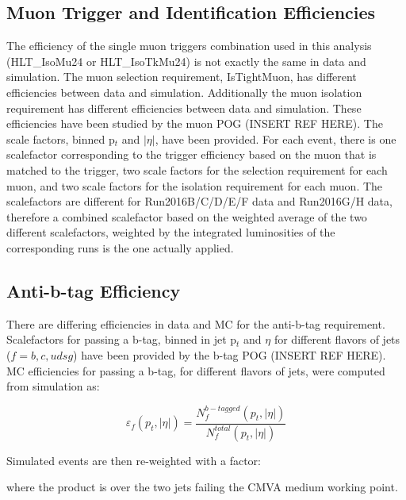\documentclass[
    10pt, %
    a4paper, %
    oneside, %
    headinclude,footinclude, %
    BCOR5mm, %
]{scrartcl}
\begin{document}
    \subsection{Muon Trigger and Identification Efficiencies}
    The efficiency of the single muon triggers combination used in this analysis (HLT\_IsoMu24 or HLT\_IsoTkMu24) is not exactly the same in data and simulation. 
    The muon selection requirement, IsTightMuon, has different efficiencies between data and simulation.
    Additionally the muon isolation requirement has different efficiencies between data and simulation.
    These efficiencies have been studied by the muon POG (INSERT REF HERE).
    The scale factors, binned p$_t$ and $|\eta|$, have been provided.
    For each event, there is one scalefactor corresponding to the trigger efficiency based on the muon that is matched to the trigger,
    two scale factors for the selection requirement for each muon, and two scale factors for the isolation requirement for each muon. 
    The scalefactors are different for Run2016B/C/D/E/F data and Run2016G/H data, therefore a combined scalefactor based on the weighted average of 
    the two different scalefactors, weighted by the integrated luminosities of the corresponding runs is the one actually applied. 



    \subsection{Anti-b-tag Efficiency}
    There are differing efficiencies in data and MC for the anti-b-tag requirement. Scalefactors for passing 
    a b-tag, binned in jet p$_t$ and $\eta$ for different flavors of jets ($f = b, c, udsg$) have been provided 
    by the b-tag POG (INSERT REF HERE). MC efficiencies for passing a b-tag, for different flavors of jets,
    were computed from simulation as:

    \begin{equation}
        \varepsilon_f(p_t, |\eta|) = \frac{N_f^{b-tagged}(p_t, |\eta|)}{N_f^{total}(p_t, |\eta|)}
        \nonumber
    \end{equation}

    Simulated events are then re-weighted with a factor: \\
    \begin{center}
    \end{center}
    where the product is over the two jets failing the CMVA medium working point. \\
\end{document}
